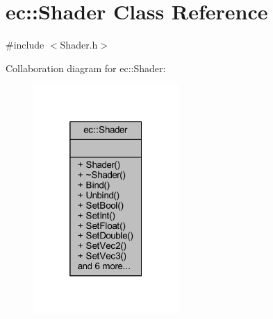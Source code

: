 \hypertarget{classec_1_1_shader}{}\section{ec\+:\+:Shader Class Reference}
\label{classec_1_1_shader}


{\ttfamily \#include $<$Shader.\+h$>$}



Collaboration diagram for ec\+:\+:Shader\+:\nopagebreak
\begin{figure}[H]
\begin{center}
\leavevmode
\includegraphics[width=157pt]{classec_1_1_shader__coll__graph}
\end{center}
\end{figure}
